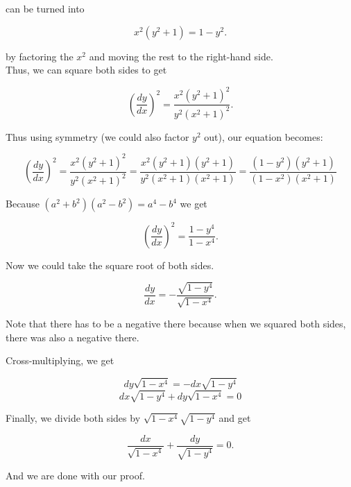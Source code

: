 \documentclass{article}
\begin{document}
can be turned into

\[x^{2} \left( y^2 + 1 \right) = 1 - y^2.\]

by factoring the $x^2$ and moving the rest to the right-hand side.\\

Thus, we can square both sides to get

\[ \left( \dfrac {dy} {dx} \right)^{2} = \dfrac {x^2 \left( y^{2} + 1 \right)^{2}} {y^2 \left( x^{2} + 1 \right)^{2}}. \]



Thus using symmetry (we could also factor $y^2$ out), our equation becomes:

\[ \left( \dfrac {dy} {dx} \right)^{2} = \dfrac {x^2 \left( y^{2} + 1 \right)^{2}} {y^2 \left( x^{2} + 1 \right)^{2}} = \dfrac {x^2 \left( y^{2} + 1 \right)\left( y^{2} + 1 \right)} {y^2 \left( x^{2} + 1 \right)\left( x^{2} + 1 \right)} = \dfrac {\left( 1 - y^2 \right) \left( y^2 + 1 \right)} {\left( 1 - x^2 \right) \left(x^2 + 1 \right)} \]

Because $\left( a^2 + b^2 \right) \left( a^2 - b^2 \right) = a^4 - b^4$ we get

\[ \left( \dfrac {dy} {dx} \right)^{2} = \dfrac {1 - y^4} {1 - x^4}. \]

Now we could take the square root of both sides.

\[\dfrac {dy} {dx} = -\dfrac {\sqrt{1 - y^4}} {\sqrt{1 - x^4}}.\]

Note that there has to be a negative there because when we squared both sides, there was also a negative there.

Cross-multiplying, we get

\[dy\sqrt{1 - x^4} = -dx\sqrt{1 - y^4}\]
\[dx\sqrt{1 - y^4} + dy\sqrt{1 - x^4} = 0\]

Finally, we divide both sides by $\sqrt{1 - x^4}\sqrt{1 - y^4}$ and get

\[ \boxed{\dfrac {dx} {\sqrt{1 - x^4}} + \dfrac {dy} {\sqrt{1 - y^4}} = 0}. \]

And we are done with our proof.
\end{document}
